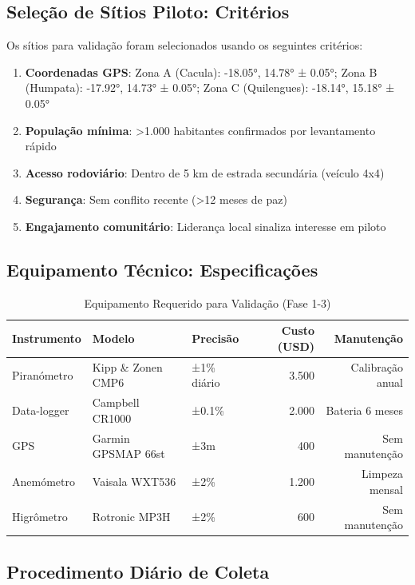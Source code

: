 \documentclass[12pt, a4paper]{article}
\begin{document}
{{{{{{{{{{{{\subsection{Seleção de Sítios Piloto: Critérios}

Os sítios para validação foram selecionados usando os seguintes critérios:

\begin{enumerate}
\item \textbf{Coordenadas GPS}: Zona A (Cacula): -18.05°, 14.78° ± 0.05°; Zona B (Humpata): -17.92°, 14.73° ± 0.05°; Zona C (Quilengues): -18.14°, 15.18° ± 0.05°
\item \textbf{População mínima}: >1.000 habitantes confirmados por levantamento rápido
\item \textbf{Acesso rodoviário}: Dentro de 5 km de estrada secundária (veículo 4x4)
\item \textbf{Segurança}: Sem conflito recente (>12 meses de paz)
\item \textbf{Engajamento comunitário}: Liderança local sinaliza interesse em piloto
\end{enumerate}

\subsection{Equipamento Técnico: Especificações}

\begin{table}[H]
\centering
\caption{Equipamento Requerido para Validação (Fase 1-3)}
\label{tab:equipment_specs}
\small
\begin{tabular}{|l|l|l|r|r|}
\hline
\textbf{Instrumento} & \textbf{Modelo} & \textbf{Precisão} & \textbf{Custo (USD)} & \textbf{Manutenção} \\
\hline
Piranómetro & Kipp \& Zonen CMP6 & ±1\% diário & 3.500 & Calibração anual \\
Data-logger & Campbell CR1000 & ±0.1\% & 2.000 & Bateria 6 meses \\
GPS & Garmin GPSMAP 66st & ±3m & 400 & Sem manutenção \\
Anemómetro & Vaisala WXT536 & ±2\% & 1.200 & Limpeza mensal \\
Higrômetro & Rotronic MP3H & ±2\% & 600 & Sem manutenção \\
\hline
\end{tabular}
\end{table}

\subsection{Procedimento Diário de Coleta}

}}}}}}}}}}}}
\end{document}
